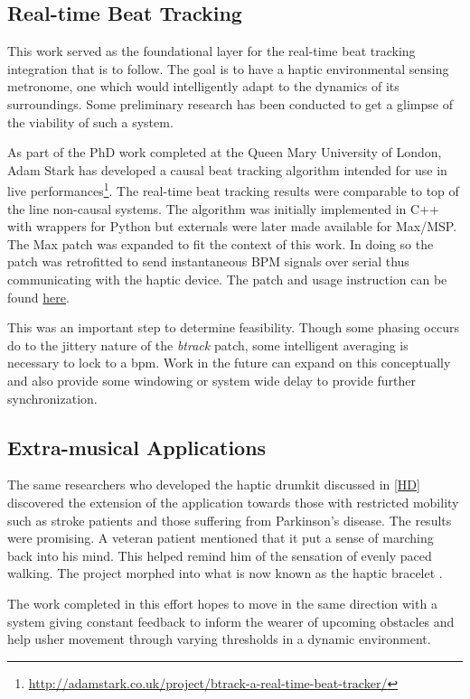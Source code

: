\subsection{Real-time Beat Tracking}
This work served as the foundational layer for the real-time beat tracking integration that is to follow. The goal is to have a haptic environmental sensing metronome, one which would intelligently adapt to the dynamics of its surroundings. Some preliminary research has been conducted to get a glimpse of the viability of such a system.

As part of the PhD work completed at the Queen Mary University of London, Adam Stark has developed a causal beat tracking algorithm intended for use in live performances\footnote{\url{http://adamstark.co.uk/project/btrack-a-real-time-beat-tracker/}}\cite{stark2009real}. The real-time beat tracking results were comparable to top of the line non-causal systems. The algorithm was initially implemented in C++ with wrappers for Python but externals were later made available for Max/MSP.
The Max patch was expanded to fit the context of this work. In doing so the patch was retrofitted to send instantaneous BPM signals over serial thus communicating with the haptic device. The patch and usage instruction can be found \href{https://github.com/afaintillusion/he-sm/tree/master/Max}{here}.

This was an important step to determine feasibility. Though some phasing occurs do to the jittery nature of the \textit{btrack} patch, some intelligent averaging is necessary to lock to a bpm. Work in the future can expand on this conceptually and also provide some windowing or system wide delay to provide further synchronization.

\subsection{Extra-musical Applications}
The same researchers who developed the haptic drumkit discussed in \ref{HD} discovered the extension of the application towards those with restricted mobility such as stroke patients and those suffering from Parkinson's disease. The results were promising. A veteran patient mentioned that it put a sense of marching back into his mind. This helped remind him of the sensation of evenly paced walking. The project morphed into what is now known as the haptic bracelet \cite{holland2014gait}.

The work completed in this effort hopes to move in the same direction with a system giving constant feedback to inform the wearer of upcoming obstacles and help usher movement through varying thresholds in a dynamic environment.